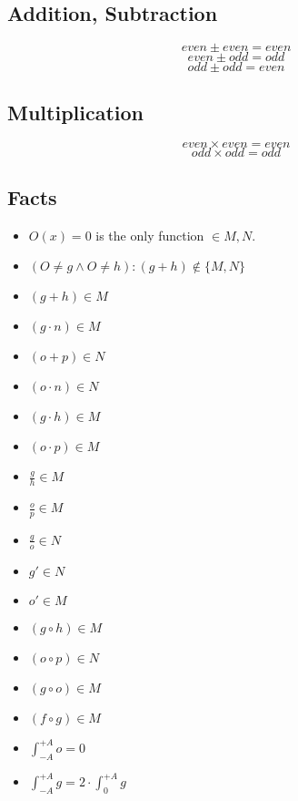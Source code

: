 \documentclass[10pt]{article}
\begin{document}
\begin{multicols}{2}

\subsection{Addition, Subtraction}

\[
    even \pm even = even
\] \[
    even \pm odd = odd
\] \[
    odd \pm odd = even
\]

\subsection{Multiplication}

\[
    even \times even = even
\] \[
    odd \times odd = odd
\]

\subsection{Facts}


\begin{itemize}
  \item $O(x) = 0$ is the only function $ \in M, N $.
  \item $(O \neq g \land O \neq h) : (g + h) \notin \Big\{ M, N \Big\} $
  \item $(g + h) \in M$
  \item $(g \cdot n) \in M$
  \item $(o + p) \in N$
  \item $(o \cdot n) \in N$
  \item $(g \cdot h) \in M$
  \item $(o \cdot p) \in M$
  \item $\frac{g}{h} \in M$
  \item $\frac{o}{p} \in M$
  \item $\frac{g}{o} \in N$
  \item $g' \in N$
  \item $o' \in M$
  \item $(g \circ h) \in M$
  \item $(o \circ p) \in N$
  \item $(g \circ o) \in M$
  \item $(f \circ g) \in M$
  \item $\int_{-A}^{+A} o = 0$
  \item $\int_{-A}^{+A} g = 2 \cdot \int_{0}^{+A} g$
\end{itemize}

\end{multicols}
\end{document}
